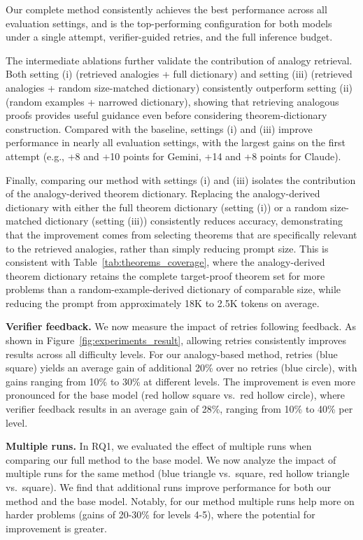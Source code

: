 Our complete method consistently achieves the best performance across all evaluation settings, and is the top-performing configuration for both models under a single attempt, verifier-guided retries, and the full inference budget.

The intermediate ablations further validate the contribution of analogy retrieval. Both setting (i) (retrieved analogies + full dictionary) and setting (iii) (retrieved analogies + random size-matched dictionary) consistently outperform setting (ii) (random examples + narrowed dictionary), showing that retrieving analogous proofs provides useful guidance even before considering theorem-dictionary construction. Compared with the baseline, settings (i) and (iii) improve performance in nearly all evaluation settings, with the largest gains on the first attempt (e.g., +8 and +10 points for Gemini, +14 and +8 points for Claude).

Finally, comparing our method with settings (i) and (iii) isolates the contribution of the analogy-derived theorem dictionary. Replacing the analogy-derived dictionary with either the full theorem dictionary (setting (i)) or a random size-matched dictionary (setting (iii)) consistently reduces accuracy, demonstrating that the improvement comes from selecting theorems that are specifically relevant to the retrieved analogies, rather than simply reducing prompt size. This is consistent with Table~\ref{tab:theorems_coverage}, where the analogy-derived theorem dictionary retains the complete target-proof theorem set for more problems than a random-example-derived dictionary of comparable size, while reducing the prompt from approximately 18K to 2.5K tokens on average.


\noindent\textbf{Verifier feedback.}
We now measure the impact of retries following feedback.
As shown in Figure~\ref{fig:experiments_result}, allowing retries consistently improves results across all difficulty levels. For our analogy-based method, 
retries (blue square) yields an average gain of additional 20\% over no retries (blue circle), with gains ranging from 10\% to 30\% at different levels.
The improvement is even more pronounced for the base model (red hollow square vs.\ red hollow circle), where verifier feedback results in an average gain of 28\%, ranging from 10\% to 40\% per level.



\noindent\textbf{Multiple runs.}  
In RQ1, we evaluated the effect of multiple runs when comparing our full method to the base model. We now analyze the impact of multiple runs for the same method (blue triangle vs.~square, red hollow triangle vs.~square).
We find that additional runs improve performance for both our method and the base model. Notably, for our method multiple runs help more on harder problems (gains of 20-30\% for levels 4-5), where the potential for improvement is greater. 
 

